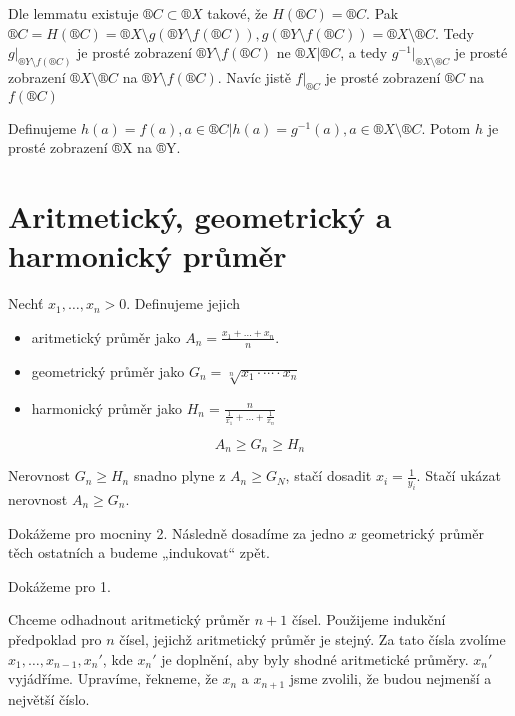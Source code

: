 \documentclass[12pt]{article}					%
\begin{document}
\begin{veta}
\begin{dukaz}
            Dle lemmatu existuje $®C \subset ®X$ takové, že $H(®C) = ®C$. Pak $®C = H(®C) = ®X \setminus g(®Y\setminus f(®C)), g(®Y \setminus f(®C)) = ®X \setminus ®C$. Tedy $g|_{®Y \setminus f(®C)}$ je prosté zobrazení $®Y\setminus f(®C)$ ne $®X|®C$, a tedy $g^{-1}|_{®X \setminus ®C}$ je prosté zobrazení $®X\setminus ®C$ na $®Y\setminus f(®C)$. Navíc jistě $f|_{®C}$ je prosté zobrazení $®C$ na $f(®C)$

            Definujeme $h(a) = f(a), a\in®C|h(a) = g^{-1}(a), a\in ®X\setminus ®C$. Potom $h$ je prosté zobrazení ®X na ®Y.
        \end{dukaz}
    \end{veta}

\section{Aritmetický, geometrický a harmonický průměr}
    \begin{definice}
        Nechť $x_1, …, x_n > 0$. Definujeme jejich
        \begin{itemize}
            \item aritmetický průměr jako $A_n = \frac{x_1 + … + x_n}{n}$.
            \item geometrický průměr jako $G_n = \sqrt[n]{x_1\cdot \cdots \cdot x_n}$
            \item harmonický průměr jako $H_n = \frac{n}{\frac{1}{x_1}+…+\frac{1}{x_n}}$
        \end{itemize}
    \end{definice}

    \begin{veta}
        $$ A_n ≥ G_n ≥ H_n $$
        \begin{poznamkain}[Pozorování]
            Nerovnost $G_n≥H_n$ snadno plyne z $A_n ≥ G_N$, stačí dosadit $x_i = \frac{1}{y_i}$. Stačí ukázat nerovnost $A_n ≥ G_n$.
        \end{poznamkain}

        \begin{dukazin}
            Dokážeme pro mocniny 2. Následně dosadíme za jedno $x$ geometrický průměr těch ostatních a budeme „indukovat“ zpět.
        \end{dukazin}

        \begin{dukazin}[2. Indukcí]
            Dokážeme pro 1.

            Chceme odhadnout aritmetický průměr $n+1$ čísel. Použijeme indukční předpoklad pro $n$ čísel, jejichž aritmetický průměr je stejný. Za tato čísla zvolíme $x_1, …, x_{n-1}, x_n'$, kde $x_n'$ je doplnění, aby byly shodné aritmetické průměry. $x_n'$ vyjádříme. Upravíme, řekneme, že $x_n$ a $x_{n+1}$ jsme zvolili, že budou nejmenší a největší číslo.
        \end{dukazin}
    \end{veta}
\end{document}
